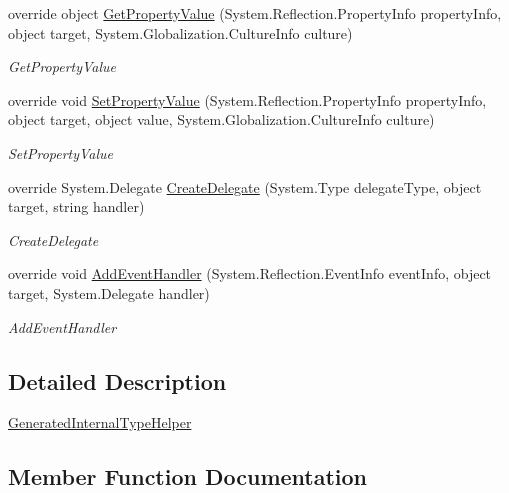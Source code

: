 \begin{DoxyCompactItemize}
override object \hyperlink{class_xaml_generated_namespace_1_1_generated_internal_type_helper_afdc9fe15b56607d02082908d934480c6}{Get\+Property\+Value} (System.\+Reflection.\+Property\+Info property\+Info, object target, System.\+Globalization.\+Culture\+Info culture)
\begin{DoxyCompactList}\small\item\em Get\+Property\+Value \end{DoxyCompactList}\item 
override void \hyperlink{class_xaml_generated_namespace_1_1_generated_internal_type_helper_ade0f04c0f7b18dd5b170e071d5534d38}{Set\+Property\+Value} (System.\+Reflection.\+Property\+Info property\+Info, object target, object value, System.\+Globalization.\+Culture\+Info culture)
\begin{DoxyCompactList}\small\item\em Set\+Property\+Value \end{DoxyCompactList}\item 
override System.\+Delegate \hyperlink{class_xaml_generated_namespace_1_1_generated_internal_type_helper_a8ec4c37e82d9f4e867e9655f4eac3a78}{Create\+Delegate} (System.\+Type delegate\+Type, object target, string handler)
\begin{DoxyCompactList}\small\item\em Create\+Delegate \end{DoxyCompactList}\item 
override void \hyperlink{class_xaml_generated_namespace_1_1_generated_internal_type_helper_a73471f4a6d1ca4c4fceec9ad8610f0c8}{Add\+Event\+Handler} (System.\+Reflection.\+Event\+Info event\+Info, object target, System.\+Delegate handler)
\begin{DoxyCompactList}\small\item\em Add\+Event\+Handler \end{DoxyCompactList}\end{DoxyCompactItemize}


\subsection{Detailed Description}
\hyperlink{class_xaml_generated_namespace_1_1_generated_internal_type_helper}{Generated\+Internal\+Type\+Helper} 



\subsection{Member Function Documentation}
\mbox{\label{class_xaml_generated_namespace_1_1_generated_internal_type_helper_a73471f4a6d1ca4c4fceec9ad8610f0c8}} 
